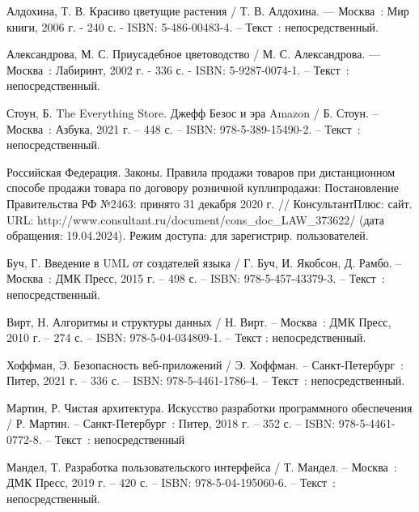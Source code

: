 \begin{thebibliography}{9}
	 Алдохина, Т. В. Красиво цветущие растения / Т. В. Алдохина. — Москва~: Мир книги, 2006 г. - 240 с. - ISBN: 5-486-00483-4. – Текст~: непосредственный.
	
	 Александрова, М. С. Приусадебное цветоводство / М. С. Александрова. — Москва~: Лабиринт, 2002 г. - 336 с. - ISBN: 5-9287-0074-1. – Текст~: непосредственный.
	
	
	 Стоун, Б. The Everything Store. Джефф Безос и эра Amazon /
	Б. Стоун. – Москва~: Азбука, 2021 г. – 448 с. – ISBN: 978-5-389-15490-2. – Текст~:
	непосредственный.
	
	 Российская Федерация. Законы. Правила продажи товаров при дистанционном способе продажи товара по договору розничной куплипродажи: Постановление Правительства РФ №2463: принято 31 декабря 2020 г. // КонсультантПлюс: сайт. URL: http://www.consultant.ru/document/cons\_doc\_LAW\_373622/ (дата обращения: 19.04.2024). Режим доступа: для зарегистрир. пользователей.
	
	 Буч, Г. Введение в UML от создателей языка / Г. Буч, И. Якобсон,
	Д. Рамбо. – Москва~: ДМК Пресс, 2015 г. – 498 с. – ISBN: 978-5-457-43379-3. –
	Текст~: непосредственный.
	
	 Вирт, Н. Алгоритмы и структуры данных / Н. Вирт. – Москва~: ДМК
	Пресс, 2010 г. – 274 с. – ISBN: 978-5-04-034809-1. – Текст : непосредственный.
	
	 Хоффман, Э. Безопасность веб-приложений / Э. Хоффман. – Санкт-Петербург~: Питер, 2021 г. – 336 с. – ISBN: 978-5-4461-1786-4. – Текст~: непосредственный.
	
	 Мартин, Р. Чистая архитектура. Искусство разработки программного обеспечения / Р. Мартин. – Санкт-Петербург~: Питер, 2018 г. – 352 с. – ISBN: 978-5-4461-0772-8. – Текст~: непосредственный
	
	 Мандел, Т. Разработка пользовательского интерфейса / Т. Мандел. – Москва~: ДМК Пресс, 2019 г. – 420 с. – ISBN: 978-5-04-195060-6. – Текст~: непосредственный.
	
\end{thebibliography}
